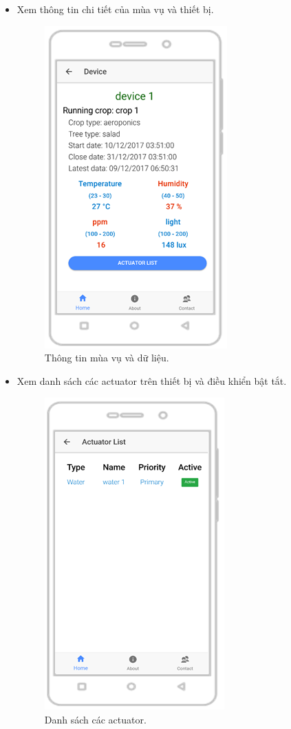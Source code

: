 \documentclass[a4paper,12pt,oneside]{article}
\begin{document}
\begin{itemize}
\newpage
\item Xem thông tin chi tiết của mùa vụ và thiết bị.
\begin{figure}[H]
\centering
\includegraphics[scale=1]{hinh/mobile_crop.png}
\caption{Thông tin mùa vụ và dữ liệu.}
\end{figure}

\newpage
\item Xem danh sách các actuator trên thiết bị và điều khiển bật tắt.
\begin{figure}[H]
\centering
\includegraphics[scale=1]{hinh/mobile_actuator_list.png}
\caption{Danh sách các actuator.}
\end{figure}
\end{itemize}
\end{document}
